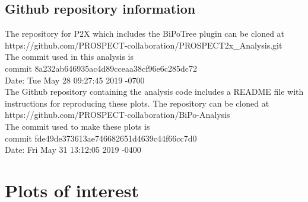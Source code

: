 \subsection{Github repository information\label{sec:github}}
The repository for P2X which includes the BiPoTree plugin can be cloned at\\ https://github.com/PROSPECT-collaboration/PROSPECT2x\_Analysis.git\\
The commit used in this analysis is \\
commit 8a232ab646935ac4d89cceaa38cf96e6c285dc72\\
Date:   Tue May 28 09:27:45 2019 -0700\\

The Github repository containing the analysis code includes a README file with instructions for reproducing these plots. The repository can be cloned at \\
https://github.com/PROSPECT-collaboration/BiPo-Analysis\\
The commit used to make these plots is\\
commit fde49de373613ae746682651d4639c44f66cc7d0\\
Date:   Fri May 31 13:12:05 2019 -0400\\
\newpage
\section{Plots of interest}
